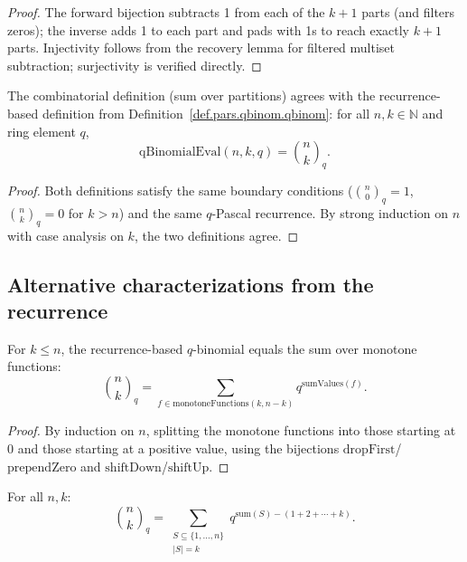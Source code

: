 \begin{proof}
\leanok
The forward bijection subtracts 1 from each of the $k{+}1$ parts (and filters zeros);
the inverse adds 1 to each part and pads with 1s to reach exactly $k{+}1$ parts.
Injectivity follows from the recovery lemma for filtered multiset subtraction;
surjectivity is verified directly.
\end{proof}

\begin{theorem}
\label{thm.qbinomial-formulas.eval-eq-qbinomial}
\leanhelper
\leanok
The combinatorial definition (sum over partitions) agrees with the recurrence-based
definition from Definition~\ref{def.pars.qbinom.qbinom}:
for all $n, k \in \mathbb{N}$ and ring element $q$,
\[
\mathrm{qBinomialEval}(n, k, q) = \binom{n}{k}_q.
\]
\end{theorem}

\begin{proof}
\leanok
Both definitions satisfy the same boundary conditions ($\binom{n}{0}_q = 1$,
$\binom{n}{k}_q = 0$ for $k > n$) and the same $q$-Pascal recurrence.
By strong induction on $n$ with case analysis on $k$, the two definitions agree.
\end{proof}

\subsection{Alternative characterizations from the recurrence}

\begin{lemma}
\label{lem.qbinomial-formulas.sum-monotone}
\leanhelper
\leanok
For $k \le n$, the recurrence-based $q$-binomial equals the sum over monotone functions:
\[
\binom{n}{k}_q = \sum_{f \in \mathrm{monotoneFunctions}(k, n{-}k)} q^{\mathrm{sumValues}(f)}.
\]
\end{lemma}

\begin{proof}
\leanok
By induction on $n$, splitting the monotone functions into those starting at 0
and those starting at a positive value, using the bijections
$\mathrm{dropFirst}$/$\mathrm{prependZero}$ and $\mathrm{shiftDown}$/$\mathrm{shiftUp}$.
\end{proof}

\begin{lemma}
\label{lem.qbinomial-formulas.sum-subsets}
\leanhelper
\leanok
For all $n, k$:
\[
\binom{n}{k}_q = \sum_{\substack{S \subseteq \{1,\ldots,n\} \\ |S|=k}}
q^{\mathrm{sum}(S) - (1+2+\cdots+k)}.
\]
\end{lemma}

